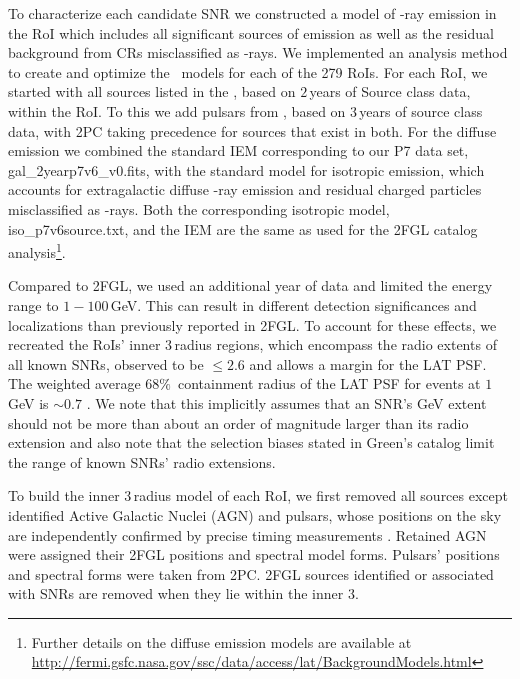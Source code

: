 {To characterize each candidate SNR we constructed a %
model of \g-ray emission in the RoI which includes all significant sources of emission as well as the residual background from CRs misclassified as \g-rays. We implemented an analysis method to create and optimize the ~models for each of the 279 RoIs. For each RoI, we started with all sources listed in 
the \twofgl \citep{2FGL}, based on $2$\,years of Source class data, within the RoI. To this we add pulsars from \twopc \citep{2PC}, based on $3$\,years of source class data, with 2PC taking precedence for sources that exist in both. 
For the diffuse emission we combined the standard IEM corresponding to our P7 data set, gal\_2yearp7v6\_v0.fits, with the standard %
model for isotropic emission, which accounts for extragalactic diffuse \g-ray emission and residual charged particles misclassified as \g-rays. 
Both the corresponding isotropic model, iso\_p7v6source.txt, and the IEM are the same as used for the 2FGL catalog analysis\footnote{Further details on the diffuse emission models are available at \url{http://fermi.gsfc.nasa.gov/ssc/data/access/lat/BackgroundModels.html}}.

Compared to 2FGL, we used an additional year of data and limited the energy range to $1-100$\,GeV. This can result in different detection significances and localizations than previously reported in 2FGL. To account for these effects, we recreated the RoIs' inner $3$\degr{}\,radius regions, which encompass the radio extents of all known SNRs, observed to be $\leq 2.6$\degr{} and allows a margin for the LAT PSF. 
The weighted average $68\%$~containment radius of the LAT PSF for %
events at $1$\,GeV is $\sim0.7$\degr{} \citep{lat_cm}. 
We note that this implicitly assumes that an SNR's GeV extent should not be more than about an order of magnitude larger than its radio extension and also note that the selection biases stated in Green's catalog limit the range of known SNRs' radio extensions. 

To build the inner $3$\degr{}\,radius model of each RoI, we first removed all sources except identified Active Galactic Nuclei (AGN) and pulsars, whose positions on the sky are independently confirmed by precise timing measurements \citep{2PC}. Retained AGN were assigned their 2FGL positions and spectral model forms. Pulsars' positions and spectral forms were taken from 2PC. 2FGL sources identified or associated with SNRs are removed when they lie within the inner $3$\degr{}. %

}
